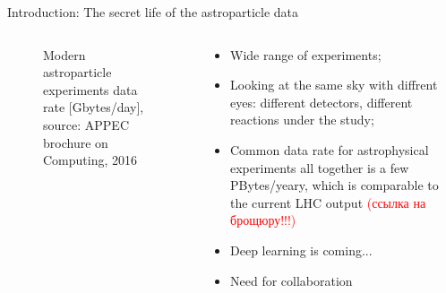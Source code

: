 \documentclass[18pt]{beamer}
\begin{document}
\begin{frame}{Introduction: The secret life of the astroparticle data}
\small
\begin{columns}

  \begin{column}[t]{0.49\textwidth}
    \begin{figure}[h]
    \vspace{-1em}
    \hspace{-1em}
    \vspace{-1em}
    \caption{\small Modern astroparticle experiments data rate [Gbytes/day], source: APPEC brochure on Computing, 2016}
    \label{ris:image}
    \end{figure}
  \end{column}
  \hfill
  \begin{column}[t]{0.49\textwidth}
    \begin{itemize}
    \item Wide range of experiments;
    \item Looking at the same sky with diffrent eyes: different detectors, different reactions under the study;
    \item Common data rate for astrophysical experiments all together is a few PBytes/yeary, which is comparable to the current LHC output \textcolor{red}{(ссылка на брощюру!!!)}
    \item Deep learning is coming...
    \item Need for collaboration
    \end{itemize}


\end{column}
\end{columns}
\end{frame}
\end{document}
